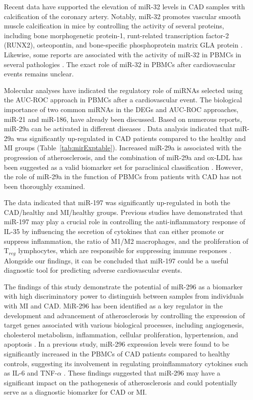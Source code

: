 \documentclass[sn-mathphys,Numbered]{sn-jnl}%
\theoremstyle{thmstyleone}%
\theoremstyle{thmstyletwo}%
\theoremstyle{thmstylethree}%
\begin{document}
Recent data have supported the elevation of miR-32 levels in CAD samples
with calcification of the coronary artery. Notably, miR-32 promotes
vascular smooth muscle calcification in mice by controlling the activity
of several proteins, including bone morphogenetic protein-1,
runt-related transcription factor-2 (RUNX2), osteopontin, and
bone-specific phosphoprotein matrix GLA protein \cite{32-2}.
Likewise, some reports are associated with the activity of miR-32 in
PBMCs in several pathologies \cite{magic, 32}. The
exact role of miR-32 in PBMCs after cardiovascular events remains
unclear.

Molecular analyses have indicated the regulatory role of miRNAs selected
using the AUC-ROC approach in PBMCs after a cardiovascular event. The
biological importance of two common miRNAs in the DEGs and AUC-ROC
approaches, miR-21 and miR-186, have already been discussed. Based on
numerous reports, miR-29a can be activated in different diseases \cite{29aa}. Data analysis indicated that
miR-29a was significantly up-regulated in CAD patients compared to the
healthy and MI groups (Table~\ref{tab:mirExptable}). Increased miR-29a
is associated with the progression of atherosclerosis, and the
combination of miR-29a and ox-LDL has been suggested as a valid
biomarker set for paraclinical classification \cite{29a}.
However, the role of miR-29a in the function of PBMCs from patients with
CAD has not been thoroughly examined.

The data indicated that miR-197 was significantly up-regulated in both
the CAD/healthy and MI/healthy groups. Previous studies have
demonstrated that miR-197 may play a crucial role in controlling the
anti-inflammatory response of IL-35 by influencing the secretion of
cytokines that can either promote or suppress inflammation, the ratio of
M1/M2 macrophages, and the proliferation of T$_{reg}$ lymphocytes,
which are responsible for suppressing immune responses \cite{197}. Alongside our findings, it can be concluded that miR-197 could be
a useful diagnostic tool for predicting adverse cardiovascular events.

The findings of this study demonstrate the potential of miR-296 as a
biomarker with high discriminatory power to distinguish between samples
from individuals with MI and CAD. MiR-296 has been identified as a key
regulator in the development and advancement of atherosclerosis by
controlling the expression of target genes associated with various
biological processes, including angiogenesis, cholesterol metabolism,
inflammation, cellular proliferation, hypertension, and apoptosis \cite{296}. In a previous study, miR-296 expression levels were found
to be significantly increased in the PBMCs of CAD patients compared to
healthy controls, suggesting its involvement in regulating
proinflammatory cytokines such as IL-6 and TNF-$\alpha$ \cite{296a}. These findings suggested that miR-296 may have a significant
impact on the pathogenesis of atherosclerosis and could potentially
serve as a diagnostic biomarker for CAD or MI.
 
\end{document}
